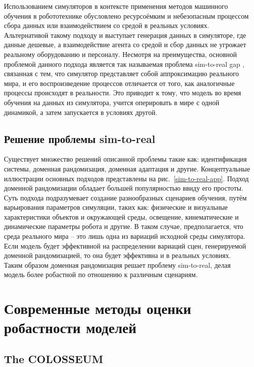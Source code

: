          Использованием симуляторов в контексте применения методов машинного обучения в робототехнике обусловлено ресурсоёмким и небезопасным процессом сбора данных или взаимодействием со средой в реальных условиях. Альтернативой такому подходу и выступает генерация данных в симуляторе, где данные дешевые, а взаимодействие агента со средой и сбор данных не угрожает реальному оборудованию и персоналу. Несмотря на преимущества, основной проблемой данного подхода является так называемая проблема sim-to-real gap \cite{he2023bridging}, связанная с тем, что симулятор представляет собой аппроксимацию реального мира, и его воспроизведение процессов отличается от того, как аналогичные процессы происходят в реальности. Это приводит к тому, что модель во время обучения на данных из симулятора, учится оперировать в мире с одной динамикой, а затем запускается в условиях другой.

    \subsection{Решение проблемы sim-to-real}

        Существует множество решений описанной проблемы такие как: идентификация системы, доменная рандомизация, доменная адаптация и другие. Концептуальные иллюстрации основных подходов представлены на рис.~\ref{sim-to-real-app}. Подход доменной рандомизации обладает большей популярностью ввиду его простоты. Суть подхода подразумевает создание разнообразных сценариев обучения, путём варьирования параметров симуляции, таких как: физические и визуальные характеристики объектов и окружающей среды, освещение, кинематические и динамические параметры робота и другие. В таком случае, предполагается, что среда реального мира -- это лишь одна из вариаций исходной среды симулятора. Если модель будет эффективной на распределении вариаций сцен, генерируемой доменной рандомизацией, то она будет эффективна и в реальных условиях. Таким образом доменная рандомизация решает проблему sim-to-real, делая модель более робастной по отношению к различным сценариям.  

\section{Современные методы оценки робастности моделей}

        \subsection{The COLOSSEUM}
    

